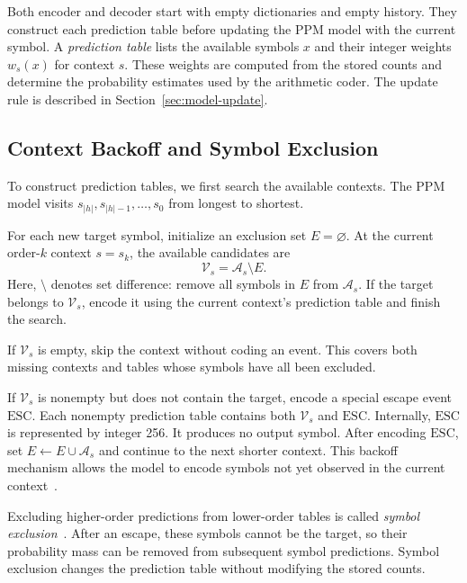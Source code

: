 \documentclass[12pt,onecolumn]{article}
\newcommand{\ESC}{\mathrm{ESC}}
\begin{document}
Both encoder and decoder start with empty dictionaries and empty history.
They construct each prediction table before updating the PPM model with the current
symbol. A \emph{prediction table} lists the available symbols $x$ and their integer
weights $w_s(x)$ for context $s$. These weights are computed from the stored counts and determine the
probability estimates used by the arithmetic coder.
The update rule is described in Section~\ref{sec:model-update}.

\subsection{Context Backoff and Symbol Exclusion}

To construct prediction tables, we first search the available contexts.
The PPM model visits $s_{|h|},s_{|h|-1},\ldots,s_0$ from longest to shortest.

For each new target symbol, initialize an exclusion set $E=\varnothing$.
At the current order-$k$ context $s=s_k$, the available candidates are
\begin{equation}
  \mathcal{V}_s=\mathcal{A}_s\setminus E.
\end{equation}
Here, $\setminus$ denotes set difference: remove all symbols in $E$ from
$\mathcal{A}_s$.
If the target belongs to $\mathcal{V}_s$, encode it using the current context's
prediction table and finish the search.

If $\mathcal{V}_s$ is empty, skip the context without coding an event. This covers
both missing contexts and tables whose symbols have all been excluded.

If $\mathcal{V}_s$ is nonempty but does not contain the target, encode a special
escape event $\ESC$. Each nonempty prediction table contains both
$\mathcal{V}_s$ and $\ESC$. Internally, $\ESC$ is represented by integer 256.
It produces no output symbol. After encoding $\ESC$, set
$E\leftarrow E\cup\mathcal{A}_s$ and continue to the next shorter context.
This backoff mechanism allows the model to encode symbols not yet observed
in the current context~\cite{cleary1984,teahan1995}.

Excluding higher-order predictions from lower-order tables is called
\emph{symbol exclusion}~\cite{teahan1995}. After an escape, these symbols cannot
be the target, so their probability mass can be removed from subsequent symbol
predictions. Symbol exclusion changes the prediction table without modifying
the stored counts.
\end{document}
